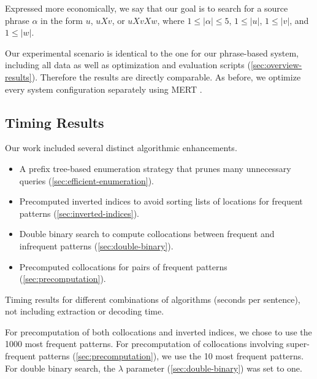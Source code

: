 \noindent Expressed more economically, we say that our goal is to
search for a source phrase $\alpha$ in the form $u$, $uXv$, or $uXvXw$, where
$1 \leq |\alpha| \leq 5$, $1 \leq |u|$, $1 \leq |v|$, and $1 \leq |w|$.

Our experimental scenario is identical to the one for our
phrase-based system, including all data as well as optimization
and evaluation scripts (\textsection\ref{sec:overview-results}).
Therefore the results are directly comparable.
As before, we optimize every system configuration separately
using MERT \citep[\textsection\ref{sec:minimum-error-rate-training};][]{Och:2003:acl}.

\subsection{Timing Results}\label{sec:algorithmic-timing-results}

Our work included several distinct algorithmic enhancements.

\begin{itemize}
	\item A prefix tree-based enumeration strategy that prunes many unnecessary queries 
		(\textsection\ref{sec:efficient-enumeration}).
	\item Precomputed inverted indices to avoid sorting lists of locations for frequent patterns 
		(\textsection\ref{sec:inverted-indices}).
	\item Double binary search to compute collocations between frequent and infrequent patterns 
		(\textsection\ref{sec:double-binary}).
	\item Precomputed collocations for pairs of frequent patterns 
		(\textsection\ref{sec:precomputation}).
\end{itemize}

\begin{table}
	
	\caption{Timing results for different combinations of algorithms (seconds per sentence), not including extraction or decoding time.}
	\label{table:hiero-timing-results}
\end{table}

For precomputation of both collocations and inverted indices,
we chose to use the 1000 most frequent patterns.  For precomputation
of collocations involving super-frequent patterns 
(\textsection\ref{sec:precomputation}), we use
the 10 most frequent patterns.  For double binary search,
the $\lambda$ parameter (\textsection\ref{sec:double-binary}) 
was set to one.

